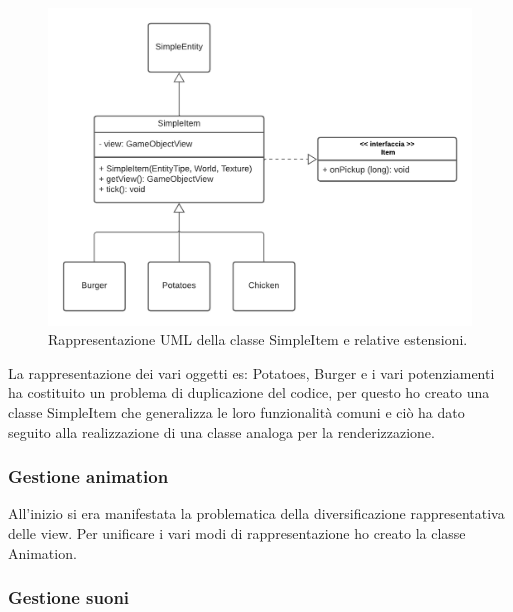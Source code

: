 \documentclass[a4paper,12pt]{report}
\begin{document}
    \begin{figure}[H]
        \centering{}
        \includegraphics[scale=0.75] {img/simple-item.png}
        \caption{Rappresentazione UML della classe SimpleItem e relative estensioni.}
        \label{img:simple-item}
    \end{figure}

    La rappresentazione dei vari oggetti es: Potatoes, Burger e i  vari potenziamenti ha costituito un problema di duplicazione del codice, per questo ho creato una classe SimpleItem che generalizza le loro funzionalità comuni e ciò  ha dato seguito alla realizzazione di una classe analoga per la renderizzazione.

    \subsubsection{Gestione animation}

    All'inizio si era manifestata la problematica della diversificazione rappresentativa delle view. Per unificare i vari modi di rappresentazione ho creato la classe Animation.

    \subsubsection{Gestione suoni}
\end{document}
